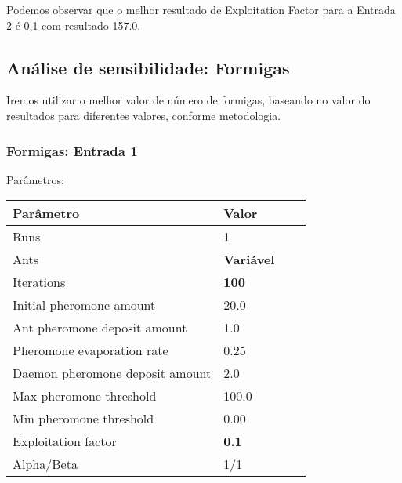 \documentclass{article}
\begin{document}
\par
Podemos observar que o melhor resultado de Exploitation Factor para a Entrada 2 é 0,1 com resultado 157.0. 


\newpage















\subsection{Análise de sensibilidade: Formigas} 

Iremos utilizar o melhor valor de número de formigas, baseando no valor do resultados para diferentes valores, conforme metodologia.

\subsubsection{Formigas: Entrada 1}
\par Parâmetros:
\newline
\begin{center}
    \begin{tabular}{| l | l | l | l |}
    \hline
    Parâmetro & Valor \\ \hline
    Runs & 1 \\ \hline
    Ants & \textbf{Variável} \\ \hline
    Iterations & \textbf{100} \\ \hline
    Initial pheromone amount & 20.0 \\ \hline
    Ant pheromone deposit amount & 1.0 \\ \hline
    Pheromone evaporation rate & 0.25 \\ \hline
    Daemon pheromone deposit amount & 2.0 \\ \hline
    Max pheromone threshold & 100.0 \\ \hline
    Min pheromone threshold & 0.00 \\ \hline
    Exploitation factor & \textbf{0.1} \\ \hline
    Alpha/Beta & 1/1 \\ \hline
    \end{tabular}
\end{center}
\end{document}
